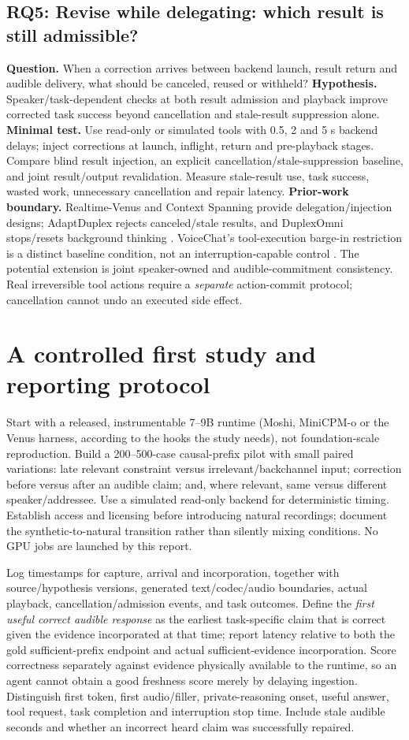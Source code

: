 \documentclass{article}
\newcommand{\researchquestion}[2]{\subsection{#1: #2}}
\begin{document}
\researchquestion{RQ5}{Revise while delegating: which result is still admissible?}
\textbf{Question.} When a correction arrives between backend launch, result return and audible delivery, what should be canceled, reused or withheld? \textbf{Hypothesis.} Speaker/task-dependent checks at both result admission and playback improve corrected task success beyond cancellation and stale-result suppression alone. \textbf{Minimal test.} Use read-only or simulated tools with 0.5, 2 and 5 s backend delays; inject corrections at launch, inflight, return and pre-playback stages. Compare blind result injection, an explicit cancellation/stale-suppression baseline, and joint result/output revalidation. Measure stale-result use, task success, wasted work, unnecessary cancellation and repair latency. \textbf{Prior-work boundary.} Realtime-Venus and Context Spanning provide delegation/injection designs; AdaptDuplex rejects canceled/stale results, and DuplexOmni stops/resets background thinking \citep{venus,contextspan,adapt,duplexomni}. VoiceChat's tool-execution barge-in restriction is a distinct baseline condition, not an interruption-capable control \citep{voicechat}. The potential extension is joint speaker-owned and audible-commitment consistency. Real irreversible tool actions require a \emph{separate} action-commit protocol; cancellation cannot undo an executed side effect.

\section{A controlled first study and reporting protocol}
\label{sec:protocol}
Start with a released, instrumentable 7--9B runtime (Moshi, MiniCPM-o or the Venus harness, according to the hooks the study needs), not foundation-scale reproduction. Build a 200--500-case causal-prefix pilot with small paired variations: late relevant constraint versus irrelevant/backchannel input; correction before versus after an audible claim; and, where relevant, same versus different speaker/addressee. Use a simulated read-only backend for deterministic timing. Establish access and licensing before introducing natural recordings; document the synthetic-to-natural transition rather than silently mixing conditions. No GPU jobs are launched by this report.

Log timestamps for capture, arrival and incorporation, together with source/hypothesis versions, generated text/codec/audio boundaries, actual playback, cancellation/admission events, and task outcomes. Define the \emph{first useful correct audible response} as the earliest task-specific claim that is correct given the evidence incorporated at that time; report latency relative to both the gold sufficient-prefix endpoint and actual sufficient-evidence incorporation. Score correctness separately against evidence physically available to the runtime, so an agent cannot obtain a good freshness score merely by delaying ingestion. Distinguish first token, first audio/filler, private-reasoning onset, useful answer, tool request, task completion and interruption stop time. Include stale audible seconds and whether an incorrect heard claim was successfully repaired.
\end{document}
